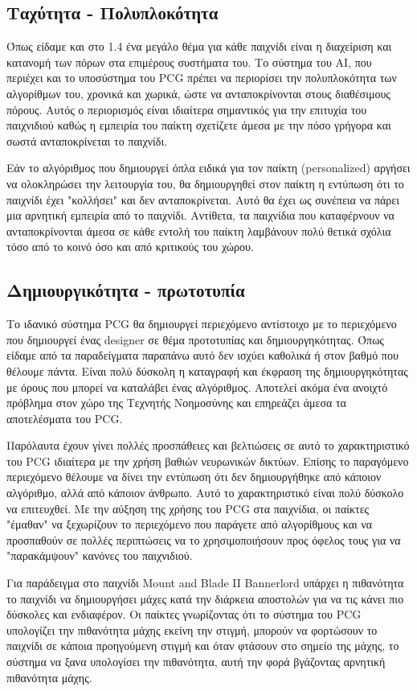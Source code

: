 \subsection{Ταχύτητα - Πολυπλοκότητα} Όπως είδαμε και στο 1.4 ένα μεγάλο θέμα για κάθε παιχνίδι είναι η διαχείριση και κατανομή των πόρων στα επιμέρους συστήματα του. Το σύστημα του AI, που περιέχει και το υποσύστημα του PCG πρέπει να περιορίσει την πολυπλοκότητα των αλγορίθμων του, χρονικά και χωρικά, ώστε να ανταποκρίνονται στους διαθέσιμους πόρους. Αυτός ο περιορισμός είναι ιδιαίτερα σημαντικός για την επιτυχία του παιχνιδιού καθώς η εμπειρία του παίκτη σχετίζετε άμεσα με την πόσο γρήγορα και σωστά ανταποκρίνεται το παιχνίδι. 
\par
Εάν το αλγόριθμος που δημιουργεί όπλα ειδικά για τον παίκτη (personalized) αργήσει να ολοκληρώσει την λειτουργία του, θα δημιουργηθεί στον παίκτη η εντύπωση ότι το παιχνίδι έχει "κολλήσει" και δεν ανταποκρίνεται. Αυτό θα έχει ως συνέπεια να πάρει μια αρνητική εμπειρία από το παιχνίδι. Αντίθετα, τα παιχνίδια που καταφέρνουν να ανταποκρίνονται άμεσα σε κάθε εντολή του παίκτη λαμβάνουν πολύ θετικά σχόλια τόσο από το κοινό όσο και από κριτικούς του χώρου.

\subsection{Δημιουργικότητα - πρωτοτυπία} Το ιδανικό σύστημα PCG θα δημιουργεί περιεχόμενο αντίστοιχο με το περιεχόμενο που δημιουργεί ένας designer σε θέμα προτοτυπίας και δημιουργηκότητας. Όπως είδαμε από τα παραδείγματα παραπάνω αυτό δεν ισχύει καθολικά ή στον βαθμό που θέλουμε πάντα. Είναι πολύ δύσκολη η καταγραφή και έκφραση της δημιουργηκότητας με όρους που μπορεί να καταλάβει ένας αλγόριθμος. Αποτελεί ακόμα ένα ανοιχτό πρόβλημα στον χώρο της Τεχνητής Νοημοσύνης και επηρεάζει άμεσα τα αποτελέσματα του PCG.
\par
Παρόλαυτα έχουν γίνει πολλές προσπάθειες και βελτιώσεις σε αυτό το χαρακτηριστικό του PCG ιδιαίτερα με την χρήση βαθιών νευρωνικών δικτύων. Επίσης το παραγόμενο περιεχόμενο θέλουμε να δίνει την εντύπωση ότι δεν δημιουργήθηκε από κάποιον αλγόριθμο, αλλά από κάποιον άνθρωπο. Αυτό το χαρακτηριστικό είναι πολύ δύσκολο να επιτευχθεί. Με την αύξηση της χρήσης του PCG στα παιχνίδια, οι παίκτες "έμαθαν" να ξεχωρίζουν το περιεχόμενο που παράγετε από αλγορίθμους και να προσπαθούν σε πολλές περιπτώσεις να το χρησιμοποιήσουν προς όφελος τους για να "παρακάμψουν" κανόνες του παιχνιδιού.
\par
Για παράδειγμα στο παιχνίδι Mount and Blade II Bannerlord \cite{bannerlord} υπάρχει η πιθανότητα το παιχνίδι να δημιουργήσει μάχες κατά την διάρκεια αποστολών για να τις κάνει πιο δύσκολες και ενδιαφέρον. Οι παίκτες γνωρίζοντας ότι το σύστημα του PCG υπολογίζει την πιθανότητα μάχης εκείνη την στιγμή, μπορούν να φορτώσουν το παιχνίδι σε κάποια προηγούμενη στιγμή και όταν φτάσουν στο σημείο της μάχης, το σύστημα να ξανα υπολογίσει την πιθανότητα, αυτή την φορά βγάζοντας αρνητική πιθανότητα μάχης. 

